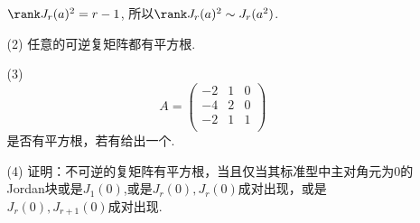 \begin{itemize}
\begin{itemize}
\begin{solution}
            $\rank J_r(a)^2 = r-1$, 所以$\rank J_r(a)^2 \sim J_r(a^2)$.
        \end{solution}
        \vspace{3cm}
        \item[(2)] 任意的可逆复矩阵都有平方根.
        \vspace{3cm}
        \item[(3)]
        \begin{equation}
        \nonumber
            A = 
            \begin{pmatrix}
               -2& 1& 0\\
               -4& 2& 0\\
               -2& 1& 1\\
            \end{pmatrix}
        \end{equation} 
        是否有平方根，若有给出一个.
        \vspace{3cm}
        \item[(4)] 证明：不可逆的复矩阵有平方根，当且仅当其标准型中主对角元为0的
        Jordan块或是$J_1(0)$,或是$J_r(0), J_{r}(0)$成对出现，或是$J_r(0), J_{r+1}(0)$成对出现. 
        \vspace{3cm}
    \end{itemize}
\end{itemize}
